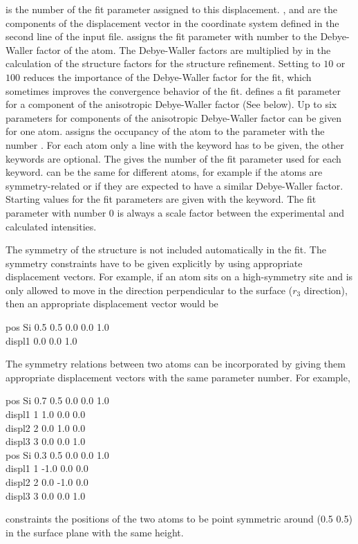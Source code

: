 \documentclass[a4paper]{article}
\begin{document}
 is the number of the fit parameter assigned to this displacement.
,  and  are the components of the displacement vector in the coordinate system defined in the second line of the input file.
 assigns the fit parameter with number  to the Debye-Waller factor of the atom. 
The Debye-Waller factors are multiplied by  in the calculation of the structure factors for the structure refinement. 
Setting  to $10$ or $100$ reduces the importance of the
Debye-Waller factor for the fit, which sometimes improves the
convergence behavior of the fit.
 defines a fit parameter for a component of the
anisotropic Debye-Waller factor (See below). Up to six parameters for
components of the anisotropic Debye-Waller factor can be given for one atom.
 assigns the occupancy of the atom to the parameter with the number .
For each atom only a line with the  keyword has to be given, the other keywords are optional.
The  gives the number of the fit parameter used for each keyword. 
 can be the same for different atoms, for example if the atoms are symmetry-related or if they are expected to have a  similar Debye-Waller factor.
Starting values for the fit parameters are given with the  keyword. 
The fit parameter with number 0 is always a scale factor between the experimental and calculated intensities.

The symmetry of the structure is not included automatically in the fit. 
The symmetry constraints have to be given explicitly by using appropriate displacement vectors.
For example, if an atom sits on a high-symmetry site and is only allowed to move in the direction perpendicular to the surface ($r_3$ direction), then an appropriate displacement vector would be
\begin{filestruc}
pos Si 0.5 0.5 0.0 0.0 1.0 \\
displ1 0.0 0.0 1.0 \\
\end{filestruc}
The symmetry relations between two atoms can be incorporated by giving them appropriate displacement vectors with the same parameter number. For example,
\begin{filestruc}
pos Si 0.7 0.5 0.0 0.0 1.0 \\
displ1 1 1.0 0.0 0.0 \\
displ2 2 0.0 1.0 0.0 \\
displ3 3 0.0 0.0 1.0 \\
pos Si 0.3 0.5 0.0 0.0 1.0 \\
displ1 1 -1.0 0.0 0.0 \\
displ2 2  0.0 -1.0 0.0 \\
displ3 3  0.0 0.0 1.0 \\
\end{filestruc}
constraints the positions of the two atoms to be point symmetric around (0.5 0.5) in the surface plane with the same height.
\end{document}
